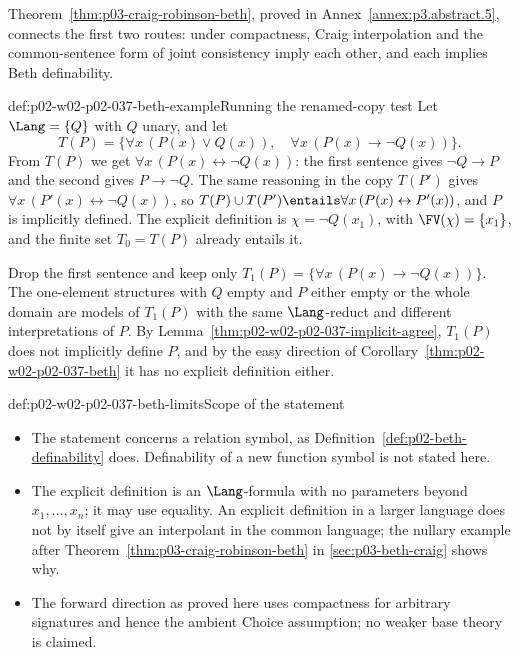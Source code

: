 Theorem~\ref{thm:p03-craig-robinson-beth}, proved in
Annex~\ref{annex:p3.abstract.5}, connects the first two routes: under
compactness, Craig interpolation and the common-sentence form of joint
consistency imply each other, and each implies Beth definability.

\begin{hbexample}{def:p02-w02-p02-037-beth-example}{Running the renamed-copy test}
Let \(\Lang=\{Q\}\) with \(Q\) unary, and let
\[
 T(P)=\bigl\{\forall x\,(P(x)\lor Q(x)),\quad
             \forall x\,(P(x)\to\neg Q(x))\bigr\}.
\]
From \(T(P)\) we get \(\forall x\,(P(x)\leftrightarrow\neg Q(x))\): the
first sentence gives \(\neg Q\to P\) and the second gives
\(P\to\neg Q\).  The same reasoning in the copy \(T(P')\) gives
\(\forall x\,(P'(x)\leftrightarrow\neg Q(x))\), so
\(T(P)\cup T(P')\entails\forall x\,(P(x)\leftrightarrow P'(x))\), and
\(P\) is implicitly defined.  The explicit definition is
\(\chi=\neg Q(x_1)\), with \(\FV(\chi)=\{x_1\}\), and the finite set
\(T_0=T(P)\) already entails it.

Drop the first sentence and keep only
\(T_1(P)=\{\forall x\,(P(x)\to\neg Q(x))\}\).  The one-element structures
with \(Q\) empty and \(P\) either empty or the whole domain are models of
\(T_1(P)\) with the same \(\Lang\)-reduct and different interpretations of
\(P\).  By Lemma~\ref{thm:p02-w02-p02-037-implicit-agree}, \(T_1(P)\) does
not implicitly define \(P\), and by the easy direction of
Corollary~\ref{thm:p02-w02-p02-037-beth} it has no explicit definition
either.
\end{hbexample}

\begin{hbwarning}{def:p02-w02-p02-037-beth-limits}{Scope of the statement}
\begin{itemize}
 \item The statement concerns a relation symbol, as
       Definition~\ref{def:p02-beth-definability} does.  Definability of a
       new function symbol is not stated here.
 \item The explicit definition is an \(\Lang\)-formula with no parameters
       beyond \(x_1,\ldots,x_n\); it may use equality.  An explicit
       definition in a larger language does not by itself give an
       interpolant in the common language; the nullary example after
       Theorem~\ref{thm:p03-craig-robinson-beth} in
       \cref{sec:p03-beth-craig} shows why.
 \item The forward direction as proved here uses compactness for
       arbitrary signatures and hence the ambient Choice assumption; no
       weaker base theory is claimed.
\end{itemize}
\end{hbwarning}

